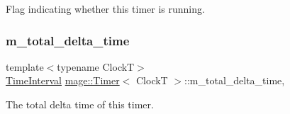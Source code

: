 Flag indicating whether this timer is running. \hypertarget{classmage_1_1_timer_aa62b280ee2b58a3f75440cc4faf10b23}{}\label{classmage_1_1_timer_aa62b280ee2b58a3f75440cc4faf10b23} 
\subsubsection{\texorpdfstring{m\+\_\+total\+\_\+delta\+\_\+time}{m\_total\_delta\_time}}
{\footnotesize\ttfamily template$<$typename ClockT$>$ \\
\hyperlink{classmage_1_1_timer_a5c0fd78ceab0110637622bd0e9b8424d}{Time\+Interval} \hyperlink{classmage_1_1_timer}{mage\+::\+Timer}$<$ ClockT $>$\+::m\+\_\+total\+\_\+delta\+\_\+time\hspace{0.3cm}{\ttfamily [mutable]}, {\ttfamily [private]}}

The total delta time of this timer. 